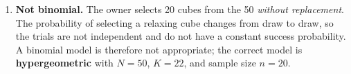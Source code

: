 \documentclass[12pt]{scrartcl}
\begin{document}
\begin{enumerate}[label=\textbf{\arabic*.}]
\begin{enumerate}[label=(\alph*)]
\begin{enumerate}[label=\roman*.]
\item \textbf{Not binomial.} The owner selects 20 cubes from the 50 \emph{without replacement}. The probability of selecting a relaxing cube changes from draw to draw, so the trials are not independent and do not have a constant success probability. A binomial model is therefore not appropriate; the correct model is \textbf{hypergeometric} with $N=50$, $K=22$, and sample size $n=20$.
\end{enumerate}
\end{enumerate}


\end{enumerate}
\end{document}
